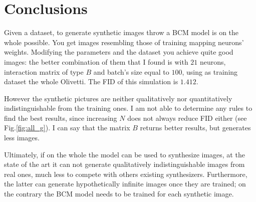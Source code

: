 \documentclass[a4paper,12pt]{article}
\begin{document}
\section{Conclusions}
Given a dataset, to generate synthetic images throw a BCM model is on the whole possible.
You get images resembling those of training mapping neurons' weights.
Modifying the parameters and the dataset you achieve quite good images: the better combination of them that I found is with $21$ neurons, interaction matrix of type $B$ and batch's size equal to $100$, using as training dataset the whole Olivetti.
The FID of this simulation is $1.412$.

However the synthetic pictures are neither qualitatively nor quantitatively indistinguishable from the training ones.
I am not able to determine any rules to find the best results, since increasing $N$ does not always reduce FID either (see Fig.\ref{fig:all_g}).
I can say that the matrix $B$ returns better results, but generates less images.

Ultimately, if on the whole the model can be used to synthesize images, at the state of the art it can not generate qualitatively indistinguishable images from real ones, much less to compete with others existing synthesizers.
Furthermore, the latter can generate hypothetically infinite images once they are trained; on the contrary the BCM model needs to be trained for each synthetic image.

\clearpage
{}
\printbibliography
\end{document}
